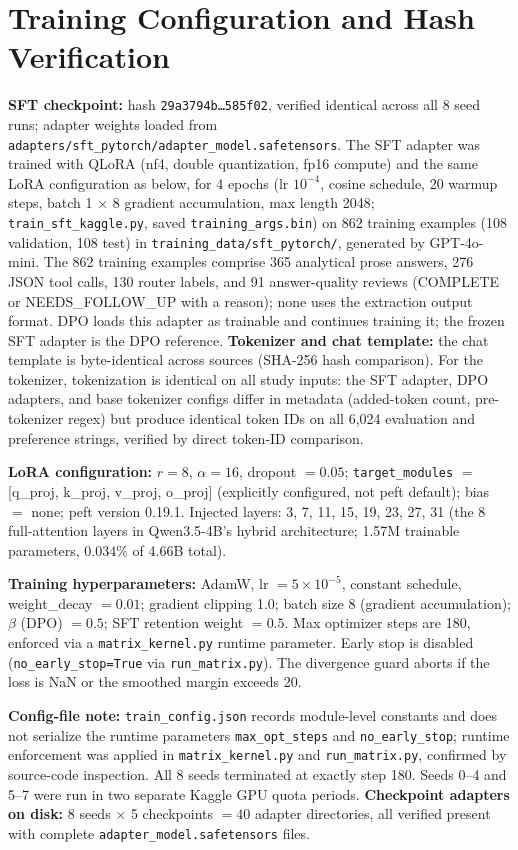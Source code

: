 \section{Training Configuration and Hash Verification}
\label{app:config}
\textbf{SFT checkpoint:} hash \texttt{29a3794b\ldots585f02}, verified identical across all 8 seed runs; adapter weights loaded from \texttt{adapters/sft\_pytorch/adapter\_model.safetensors}. The SFT adapter was trained with QLoRA (nf4, double quantization, fp16 compute) and the same LoRA configuration as below, for 4 epochs (lr $10^{-4}$, cosine schedule, 20 warmup steps, batch 1 $\times$ 8 gradient accumulation, max length 2048; \texttt{train\_sft\_kaggle.py}, saved \texttt{training\_args.bin}) on 862 training examples (108 validation, 108 test) in \texttt{training\_data/sft\_pytorch/}, generated by GPT-4o-mini. The 862 training examples comprise 365 analytical prose answers, 276 JSON tool calls, 130 router labels, and 91 answer-quality reviews (COMPLETE or NEEDS\_FOLLOW\_UP with a reason); none uses the extraction output format. DPO loads this adapter as trainable and continues training it; the frozen SFT adapter is the DPO reference. \textbf{Tokenizer and chat template:} the chat template is byte-identical across sources (SHA-256 hash comparison). For the tokenizer, tokenization is identical on all study inputs: the SFT adapter, DPO adapters, and base tokenizer configs differ in metadata (added-token count, pre-tokenizer regex) but produce identical token IDs on all 6{,}024 evaluation and preference strings, verified by direct token-ID comparison.

\textbf{LoRA configuration:} $r = 8$, $\alpha = 16$, dropout $= 0.05$; \texttt{target\_modules} $=$ [q\_proj, k\_proj, v\_proj, o\_proj] (explicitly configured, not peft default); bias $=$ none; peft version 0.19.1. Injected layers: 3, 7, 11, 15, 19, 23, 27, 31 (the 8 full-attention layers in Qwen3.5-4B's hybrid architecture; 1.57M trainable parameters, 0.034\% of 4.66B total).

\textbf{Training hyperparameters:} AdamW, lr $= 5\times10^{-5}$, constant schedule, weight\_decay $= 0.01$; gradient clipping 1.0; batch size 8 (gradient accumulation); $\beta$ (DPO) $= 0.5$; SFT retention weight $= 0.5$. Max optimizer steps are 180, enforced via a \texttt{matrix\_kernel.py} runtime parameter. Early stop is disabled (\texttt{no\_early\_stop=True} via \texttt{run\_matrix.py}). The divergence guard aborts if the loss is NaN or the smoothed margin exceeds 20.

\textbf{Config-file note:} \texttt{train\_config.json} records module-level constants and does not serialize the runtime parameters \texttt{max\_opt\_steps} and \texttt{no\_early\_stop}; runtime enforcement was applied in \texttt{matrix\_kernel.py} and \texttt{run\_matrix.py}, confirmed by source-code inspection. All 8 seeds terminated at exactly step 180. Seeds 0--4 and 5--7 were run in two separate Kaggle GPU quota periods. \textbf{Checkpoint adapters on disk:} 8 seeds $\times$ 5 checkpoints $= 40$ adapter directories, all verified present with complete \texttt{adapter\_model.safetensors} files.

